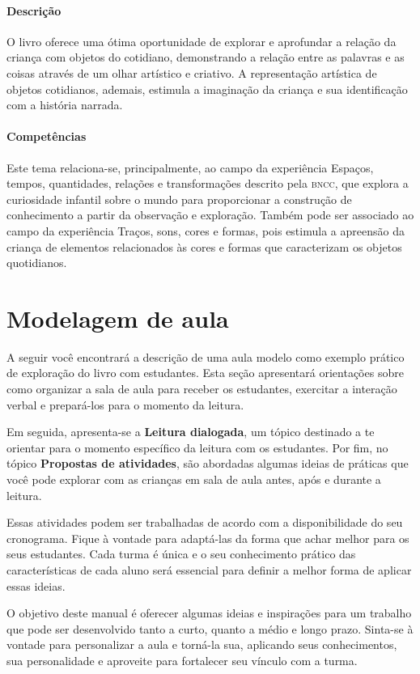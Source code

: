 \documentclass[11pt]{extarticle}
\begin{document}
\paragraph{Descrição} O livro oferece uma ótima oportunidade de explorar 
e aprofundar a relação da criança com objetos do cotidiano, demonstrando a relação entre as palavras e as coisas através de um olhar artístico e criativo. A representação artística de objetos cotidianos, ademais, estimula a imaginação da criança e sua identificação com a história narrada.

\paragraph{Competências} Este tema relaciona-se, principalmente, ao 
campo da experiência Espaços, tempos, quantidades, relações e transformações
descrito pela \textsc{bncc}, que explora a curiosidade infantil sobre o mundo 
para proporcionar a construção de conhecimento a partir da observação e exploração.
Também pode ser associado ao campo da experiência Traços, sons, cores e formas, pois estimula a apreensão da criança de elementos relacionados às cores e formas que caracterizam os objetos quotidianos.


\section{Modelagem de aula}
A seguir você encontrará a descrição de uma aula modelo como exemplo 
prático de exploração do livro com estudantes. Esta seção apresentará 
orientações sobre como organizar a sala de aula para receber os 
estudantes, exercitar a interação verbal e prepará-los para o 
momento da leitura.

Em seguida, apresenta-se a \textbf{Leitura dialogada}, um 
tópico destinado a te orientar para o momento específico da 
leitura com os estudantes. Por fim, no tópico 
\textbf{Propostas de atividades}, são abordadas algumas ideias 
de práticas que você pode explorar com as crianças em sala de 
aula antes, após e durante a leitura. 

Essas atividades podem ser trabalhadas de acordo com a 
disponibilidade do seu cronograma. Fique à vontade para adaptá-las 
da forma que achar melhor para os seus estudantes. Cada turma é única 
e o seu conhecimento prático das características de cada aluno será 
essencial para definir a melhor forma de aplicar essas ideias. 

O objetivo deste manual é oferecer algumas ideias 
e inspirações para um trabalho que pode ser desenvolvido tanto 
a curto, quanto a médio e longo prazo. Sinta-se à vontade para 
personalizar a aula e torná-la sua, aplicando seus conhecimentos, sua 
personalidade e aproveite para fortalecer 
seu vínculo com a turma.
\end{document}
